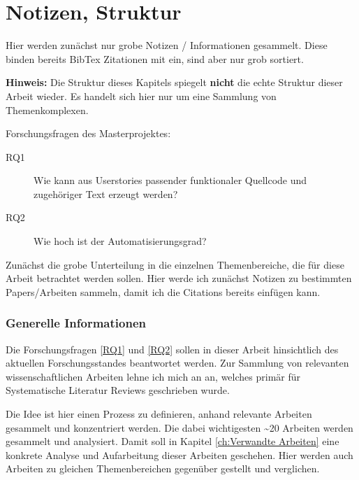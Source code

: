 \chapter{Notizen, Struktur}\label{ch:Notizen}

\begin{tcolorbox}[colback=yellow!10!white, colframe=red!75!black, title=\textbf{PROJEKT NOTIZEN}]
Hier werden zunächst nur grobe Notizen / Informationen gesammelt. Diese binden bereits BibTex Zitationen mit ein, sind aber nur grob sortiert.

\textbf{Hinweis:} Die Struktur dieses Kapitels spiegelt \textbf{nicht} die echte Struktur dieser Arbeit wieder. Es handelt sich hier nur um eine Sammlung von Themenkomplexen.
\end{tcolorbox}

Forschungsfragen des Masterprojektes:

\begin{description}
    \item[RQ1]\label{RQ1} Wie kann aus Userstories passender funktionaler Quellcode und zugehöriger Text erzeugt werden?
    \item[RQ2]\label{RQ2} Wie hoch ist der Automatisierungsgrad?
\end{description}

Zunächst die grobe Unterteilung in die einzelnen Themenbereiche, die für diese Arbeit betrachtet werden sollen. Hier werde ich zunächst Notizen zu bestimmten Papers/Arbeiten sammeln, damit ich die Citations bereits einfügen kann.


\subsection{Generelle Informationen}

Die Forschungsfragen \ref{RQ1} und \ref{RQ2} sollen in dieser Arbeit hinsichtlich des aktuellen Forschungsstandes beantwortet werden. Zur Sammlung von relevanten wissenschaftlichen Arbeiten lehne ich mich an \cite{kitchenhamGuidelinesPerformingSystematic2007} an, welches primär für Systematische Literatur Reviews geschrieben wurde.

Die Idee ist hier einen Prozess zu definieren, anhand relevante Arbeiten gesammelt und konzentriert werden. Die dabei wichtigesten \textasciitilde 20 Arbeiten werden gesammelt und analysiert. Damit soll in Kapitel \ref{ch:Verwandte Arbeiten} eine konkrete Analyse und Aufarbeitung dieser Arbeiten geschehen. Hier werden auch Arbeiten zu gleichen Themenbereichen gegenüber gestellt und verglichen.

